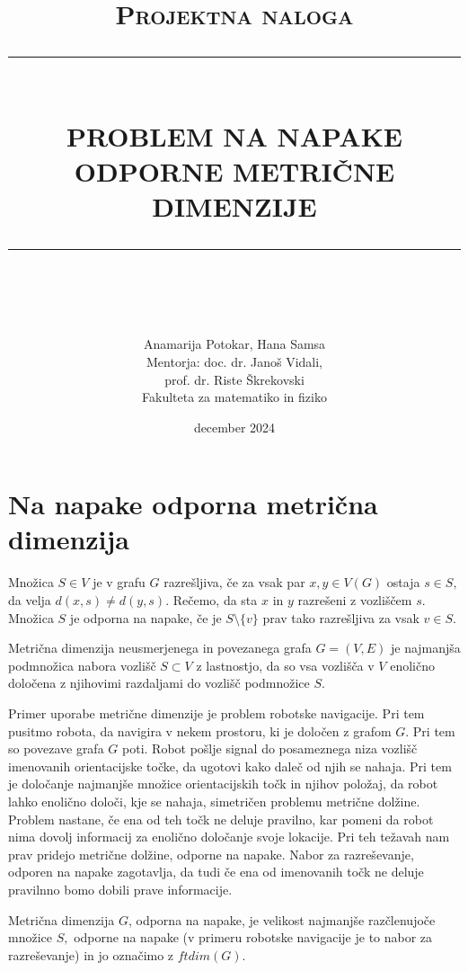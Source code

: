 \documentclass[12pt]{article}
\newcommand{\HRule}[1]{\rule{\linewidth}{#1}}
\begin{document}
\title{ \normalsize \textsc{Projektna naloga}
		\\ [2.0cm]
		\HRule{0.5pt} \\
		\LARGE \textbf{\uppercase{Problem na napake odporne metrične dimenzije}}
		\HRule{2pt} \\ [0.5cm]
		\normalsize \date{december 2024} \vspace*{5\baselineskip}}
\author{
		Anamarija Potokar, Hana Samsa 
        \vspace{1 cm} \\
		Mentorja: doc. dr. Janoš Vidali, \\
        prof. dr. Riste Škrekovski 
        \vspace{1 cm} \\
		Fakulteta za matematiko in fiziko }

\maketitle

\newpage

\section{Na napake odporna metrična dimenzija}
Množica $S \in V$ je v grafu $G$ razrešljiva, če za vsak par $x, y \in V(G)$ 
ostaja $s \in S,$ da velja $d(x, s) \neq d(y, s).$ Rečemo, da sta $x$ in $y$
razrešeni z vozliščem $s$. Množica $S$ je odporna na napake, če je 
$S \setminus \{v\}$ prav tako razrešljiva za vsak $v \in S.$ 

Metrična dimenzija neusmerjenega in povezanega grafa $G = (V, E)$ je najmanjša 
podmnožica nabora vozlišč $S \subset V$ z lastnostjo, da so vsa vozlišča v $V$ 
enolično določena z njihovimi razdaljami do vozlišč podmnožice $S$.

Primer uporabe metrične dimenzije je problem robotske navigacije. Pri tem pusitmo
robota, da navigira v nekem prostoru, ki je določen z grafom $G$. Pri tem so 
povezave grafa $G$ poti. Robot pošlje signal do posameznega niza vozlišč imenovanih 
orientacijske točke, da ugotovi kako daleč od njih se nahaja. Pri tem je določanje 
najmanjše množice orientacijskih točk in njihov položaj, da robot lahko enolično 
določi, kje se nahaja, simetričen problemu metrične dolžine. Problem nastane, 
če ena od teh točk ne deluje pravilno, kar pomeni da robot nima dovolj informacij 
za enolično določanje svoje lokacije. Pri teh težavah nam prav pridejo metrične 
dolžine, odporne na napake. 
Nabor za razreševanje, odporen na napake zagotavlja, da tudi če ena od imenovanih 
točk ne deluje pravilnno bomo dobili prave informacije.

Metrična dimenzija $G$, odporna na napake, je velikost najmanjše razčlenujoče 
množice $S,$ odporne na napake (v primeru robotske navigacije je to nabor za 
razreševanje) in jo označimo z $ftdim(G).$
\end{document}
